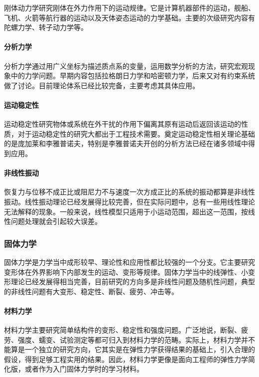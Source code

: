 刚体动力学研究刚体在外力作用下的运动规律。它是计算机器部件的运动，舰船、飞机、火箭等航行器的运动以及天体姿态运动的力学基础。主要的次级研究内容有陀螺力学、转子动力学等。

\paragraph{分析力学}

分析力学通过用广义坐标为描述质点系的变量，运用数学分析的方法，研究宏观现象中的力学问题。早期内容包括拉格朗日力学和哈密顿力学，后来又对有约束系统做了讨论。目前理论体系已经比较完备，主要考虑其具体应用。

\paragraph{运动稳定性}

运动稳定性研究物体或系统在外干扰的作用下偏离其原有运动后返回该运动的性质，对于运动稳定性的研究大都出于工程技术需要。奠定运动稳定性相关理论基础的是庞加莱和李雅普诺夫，特别是李雅普诺夫开创的分析方法已经在诸多领域中得到应用。

\paragraph{非线性振动}

恢复力与位移不成正比或阻尼力不与速度一次方成正比的系统的振动都算是非线性振动。线性振动理论已经发展得比较完善，但在实际问题中，总有一些用线性理论无法解释的现象。一般来说，线性模型只适用于小运动范围，超出这一范围，按线性问题处理就会引起较大误差。

\subsubsection{固体力学}

固体力学是力学当中成形较早、理论性和应用性都比较强的一个分支。它主要研究变形体在外界影响下内部发生的运动、变形等规律。固体力学当中的线弹性、小变形理论已经发展得相当完善，目前研究的方向多是非线性问题及随机性问题，典型的非线性问题有大变形、稳定性、断裂、疲劳、冲击等。

\paragraph{材料力学}

材料力学主要研究简单结构件的变形、稳定性和强度问题。广泛地说，断裂、疲劳、强度、蠕变、试验测定等都可归入到材料力学的范畴。实际上，材料力学并不能算是一个独立的研究方向，它其实是在弹性力学获得结果的基础上，引入合理的假设，得到足够工程实用的结果。因此，材料力学更像是面向工程师的弹性力学简化版，或者作为入门固体力学时的学习材料。

